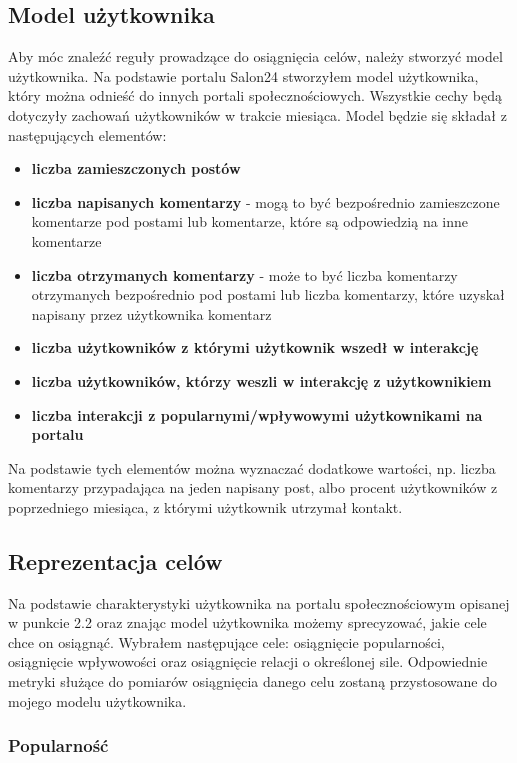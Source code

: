 \documentclass[polish,12pt]{aghthesis}
\begin{document}
\subsection{Model użytkownika}
Aby móc znaleźć reguły prowadzące do osiągnięcia celów, należy stworzyć model użytkownika. Na podstawie portalu Salon24 stworzyłem model użytkownika, który można odnieść do innych portali społecznościowych. Wszystkie cechy będą dotyczyły zachowań użytkowników w trakcie miesiąca. Model będzie się składał z następujących elementów:
\begin{itemize}
    \item \textbf{liczba zamieszczonych postów} 
    \item \textbf{liczba napisanych komentarzy} - mogą to być bezpośrednio zamieszczone komentarze pod postami lub komentarze, które są odpowiedzią na inne komentarze
    \item \textbf{liczba otrzymanych komentarzy} - może to być liczba komentarzy otrzymanych bezpośrednio pod postami lub liczba komentarzy, które uzyskał napisany przez użytkownika komentarz
    \item \textbf{liczba użytkowników z którymi użytkownik wszedł w interakcję}
    \item \textbf{liczba użytkowników, którzy weszli w interakcję z użytkownikiem}
    \item \textbf{liczba interakcji z popularnymi/wpływowymi użytkownikami na portalu}
\end{itemize}

Na podstawie tych elementów można wyznaczać dodatkowe wartości, np. liczba komentarzy przypadająca na jeden napisany post, albo procent użytkowników z poprzedniego miesiąca, z którymi użytkownik utrzymał kontakt. 



\subsection{Reprezentacja celów}
Na podstawie charakterystyki użytkownika na portalu społecznościowym opisanej w punkcie 2.2 oraz znając model użytkownika możemy sprecyzować, jakie cele chce on osiągnąć. Wybrałem następujące cele: osiągnięcie popularności, osiągnięcie wpływowości oraz osiągnięcie relacji o określonej sile. Odpowiednie metryki służące do pomiarów osiągnięcia danego celu zostaną przystosowane do mojego modelu użytkownika.

\subsubsection{Popularność}
\end{document}
